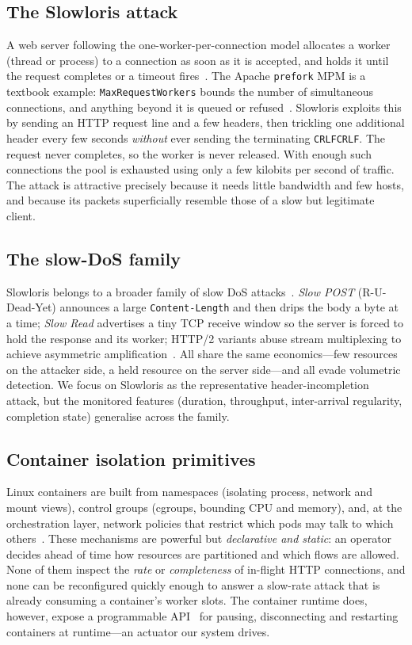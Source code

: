 \documentclass[conference]{IEEEtran}
\begin{document}
\subsection{The Slowloris attack}
A web server following the one-worker-per-connection model allocates a worker
(thread or process) to a connection as soon as it is accepted, and holds it
until the request completes or a timeout
fires~\cite{cambiaso2013slow,tripathi2021appdos}. The Apache \texttt{prefork}
MPM is a textbook example: \texttt{MaxRequestWorkers} bounds the number of
simultaneous connections, and anything beyond it is queued or
refused~\cite{apache_mpm}. Slowloris exploits this by sending an HTTP request
line and a few headers, then trickling one additional header every few seconds
\emph{without} ever sending the terminating \texttt{CRLFCRLF}. The request never
completes, so the worker is never released. With enough such connections the
pool is exhausted using only a few kilobits per second of traffic. The attack is
attractive precisely because it needs little bandwidth and few hosts, and
because its packets superficially resemble those of a slow but legitimate
client.

\subsection{The slow-DoS family}
Slowloris belongs to a broader family of slow DoS
attacks~\cite{cambiaso2013slow,tripathi2021appdos}. \emph{Slow POST}
(R-U-Dead-Yet) announces a large \texttt{Content-Length} and then drips the body a
byte at a time; \emph{Slow Read} advertises a tiny TCP receive window so the
server is forced to hold the response and its worker; HTTP/2 variants abuse stream
multiplexing to achieve asymmetric amplification~\cite{praseed2020http2}. All
share the same economics---few resources on the attacker side, a held resource on
the server side---and all evade volumetric detection. We focus on Slowloris as the
representative header-incompletion attack, but the monitored features (duration,
throughput, inter-arrival regularity, completion state) generalise across the
family.

\subsection{Container isolation primitives}
Linux containers are built from namespaces (isolating process, network and mount
views), control groups (cgroups, bounding CPU and memory), and, at the
orchestration layer, network policies that restrict which pods may talk to which
others~\cite{merkel2014docker,k8s_netpol}. These mechanisms are powerful but
\emph{declarative and static}: an operator decides ahead of time how resources
are partitioned and which flows are allowed. None of them inspect the
\emph{rate} or \emph{completeness} of in-flight HTTP connections, and none can be
reconfigured quickly enough to answer a slow-rate attack that is already
consuming a container's worker slots. The container runtime does, however,
expose a programmable API~\cite{docker_engine_api} for pausing, disconnecting and
restarting containers at runtime---an actuator our system drives.
\end{document}

